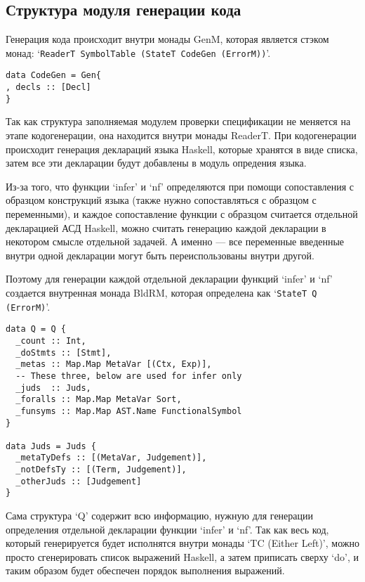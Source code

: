 \subsection{Структура модуля генерации кода}\label{repr}
Генерация кода происходит внутри монады GenM, которая является стэком монад: `\lstinline{ReaderT SymbolTable (StateT CodeGen (ErrorM))}'.

\begin{lstlisting}[caption={Структура используемая при кодогенерации},captionpos=b,frame=single]
data CodeGen = Gen{
, decls :: [Decl]
}
\end{lstlisting}

Так как структура заполняемая модулем проверки спецификации не меняется на этапе кодогенерации, она находится внутри монады ReaderT. При кодогенерации происходит генерация деклараций языка Haskell, которые хранятся в виде списка, затем все эти декларации будут добавлены в модуль опредения языка.

Из-за того, что функции `infer' и `nf' определяются при помощи сопоставления с образцом конструкций языка (также нужно сопоставляться с образцом с переменными), и каждое сопоставление функции с образцом считается отдельной декларацией АСД Haskell, можно считать генерацию каждой декларации в некотором смысле отдельной задачей. А именно --- все переменные введенные внутри одной декларации могут быть переиспользованы внутри другой.

Поэтому для генерации каждой отдельной декларации функций `infer' и `nf' создается внутренная монада BldRM, которая определена как `\lstinline{StateT Q (ErrorM)}'.

\begin{lstlisting}[caption={Структура используемая при кодогенерации функций `infer' и `nf'},captionpos=b,frame=single]
data Q = Q {
  _count :: Int,
  _doStmts :: [Stmt],
  _metas :: Map.Map MetaVar [(Ctx, Exp)],
  -- These three, below are used for infer only
  _juds  :: Juds,
  _foralls :: Map.Map MetaVar Sort,
  _funsyms :: Map.Map AST.Name FunctionalSymbol
}

data Juds = Juds {
  _metaTyDefs :: [(MetaVar, Judgement)],
  _notDefsTy :: [(Term, Judgement)],
  _otherJuds :: [Judgement]
}
\end{lstlisting}

Сама структура `Q' содержит всю информацию, нужную для генерации определения отдельной декларации функции `infer' и `nf'. Так как весь код, который генерируется будет исполнятся внутри монады `TC (Either Left)', можно просто сгенерировать список выражений Haskell, а затем приписать сверху `do', и таким образом будет обеспечен порядок выполнения выражений.

